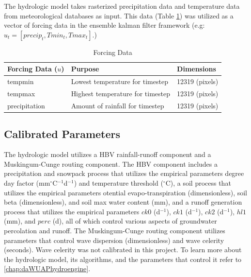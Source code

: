 The hydrologic model takes rasterized precipitation data and temperature data from meteorological databases as input. This data (Table \ref{tab:u_params}) was utilized as a vector of forcing data in the ensemble kalman filter framework (e.g: $u_{t} = [precip_{t},Tmin_{t}, Tmax_{t}]$.)

\begin{table}[]
\caption{Forcing Data} 
\begin{tabular}{lll}
Forcing Data ($u$) & Purpose                          & Dimensions \\ \hline
tempmin          & Lowest temperature for timestep  & 12319 (pixels) \\
tempmax          & Highest temperature for timestep & 12319 (pixels) \\
precipitation      & Amount of rainfall for timestep & 12319  (pixels)
\end{tabular}
\label{tab:u_params}
\end{table}

\subsection{Calibrated Parameters}

The hydrologic model utilizes a HBV rainfall-runoff component and a Muskingum-Cunge routing component. The HBV component includes a precipitation and snowpack process that utilizes the empirical parameters degree day factor (mm$^\circ$C$^{-1}$d$^{-1}$) and temperature threshold ($^\circ$C), a soil process that utilizes the empirical parameters otential evapo-transpiration (dimensionless), soil beta (dimensionless), and soil max water content (mm), and a runoff generation process that utilizes the empirical parameters $ck0$ (d$^{-1}$), $ck1$ (d$^{-1}$), $ck2$ (d$^{-1}$), $hl1$ (mm), and $perc$ (d), all of which control various aspects of groundwater percolation and runoff. The Muskingum-Cunge routing component utilizes parameters that control wave dispersion (dimensionless) and wave celerity (seconds). Wave celerity was not calibrated in this project. To learn more about the hydrologic model, its algorithms, and the parameters that control it refer to \autoref{chap:daWUAPhydroengine}.

